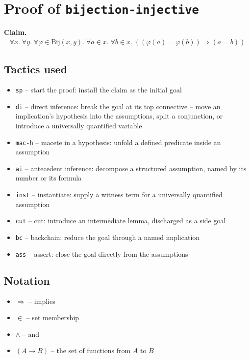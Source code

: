 \documentclass[11pt]{article}
\begin{document}
\section*{Proof of \texttt{bijection-injective}}
\textbf{Claim.}
\begin{align*}
  \forall x.\; \forall y.\; \forall \varphi \in \mathrm{Bij}(x, y).\; \forall a \in x.\; \forall b \in x.\; ((\varphi(a) = \varphi(b)) \Rightarrow (a = b))
\end{align*}
\bigskip

\subsection*{Tactics used}
\begin{itemize}
\item \texttt{sp} -- start the proof: install the claim as the initial goal
\item \texttt{di} -- direct inference: break the goal at its top connective -- move an implication's hypothesis into the assumptions, split a conjunction, or introduce a universally quantified variable
\item \texttt{mac-h} -- macete in a hypothesis: unfold a defined predicate inside an assumption
\item \texttt{ai} -- antecedent inference: decompose a structured assumption, named by its number or its formula
\item \texttt{inst} -- instantiate: supply a witness term for a universally quantified assumption
\item \texttt{cut} -- cut: introduce an intermediate lemma, discharged as a side goal
\item \texttt{bc} -- backchain: reduce the goal through a named implication
\item \texttt{ass} -- assert: close the goal directly from the assumptions
\end{itemize}

\subsection*{Notation}
\begin{itemize}
\item $\Rightarrow$ -- implies
\item $\in$ -- set membership
\item $\wedge$ -- and
\item $(A \to B)$ -- the set of functions from $A$ to $B$
\end{itemize}
\end{document}
